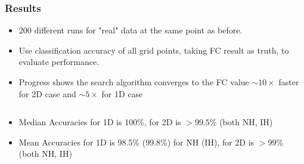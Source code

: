 \documentclass[9pt, aspectratio=169]{beamer}
\begin{document}
\begin{frame}
  \frametitle{Results}
  \begin{itemize}
    \item 200 different runs for "real" data at the same point as before.
    \item Use classification accuracy of all grid points, taking FC result as truth, to evaluate performance.
    \item Progress shows the search algorithm converges to the FC value $\sim10\times$ faster for 2D case and $\sim5\times$ for 1D case
  \end{itemize}
  \begin{columns}
  \end{columns}
  \begin{itemize}
    \item Median Accuracies for 1D is 100\%, for 2D is $> 99.5\%$ (both NH, IH)
    \item Mean Accuracies for 1D is 98.5\% (99.8\%) for NH (IH), for 2D is $> 99\%$ (both NH, IH)
  \end{itemize}
\end{frame}
\end{document}
